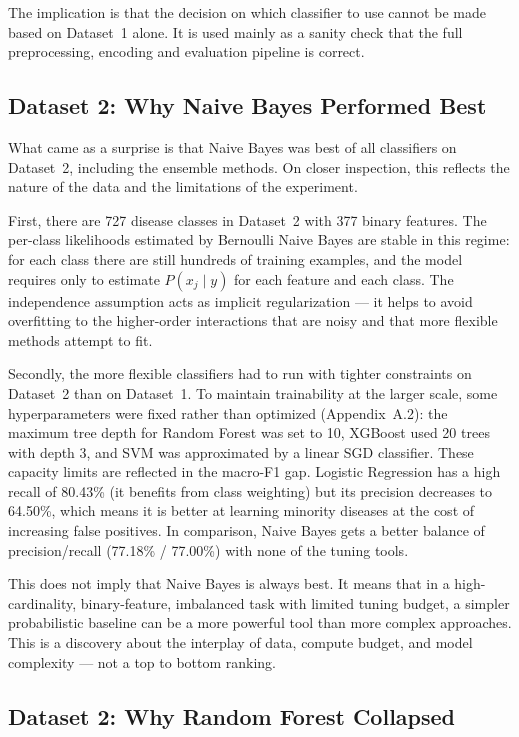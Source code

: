 The implication is that the decision on which classifier to use cannot be made based on Dataset~1 alone. It is used mainly as a sanity check that the full preprocessing, encoding and evaluation pipeline is correct.

\subsection{Dataset 2: Why Naive Bayes Performed Best}

What came as a surprise is that Naive Bayes was best of all classifiers on Dataset~2, including the ensemble methods. On closer inspection, this reflects the nature of the data and the limitations of the experiment.

First, there are 727 disease classes in Dataset~2 with 377 binary features. The per-class likelihoods estimated by Bernoulli Naive Bayes are stable in this regime: for each class there are still hundreds of training examples, and the model requires only to estimate $P(x_j \mid y)$ for each feature and each class. The independence assumption acts as implicit regularization --- it helps to avoid overfitting to the higher-order interactions that are noisy and that more flexible methods attempt to fit.

Secondly, the more flexible classifiers had to run with tighter constraints on Dataset~2 than on Dataset~1. To maintain trainability at the larger scale, some hyperparameters were fixed rather than optimized (Appendix~A.2): the maximum tree depth for Random Forest was set to 10, XGBoost used 20 trees with depth 3, and SVM was approximated by a linear SGD classifier. These capacity limits are reflected in the macro-F1 gap. Logistic Regression has a high recall of 80.43\% (it benefits from class weighting) but its precision decreases to 64.50\%, which means it is better at learning minority diseases at the cost of increasing false positives. In comparison, Naive Bayes gets a better balance of precision/recall (77.18\% / 77.00\%) with none of the tuning tools.

This does not imply that Naive Bayes is always best. It means that in a high-cardinality, binary-feature, imbalanced task with limited tuning budget, a simpler probabilistic baseline can be a more powerful tool than more complex approaches. This is a discovery about the interplay of data, compute budget, and model complexity --- not a top to bottom ranking.

\subsection{Dataset 2: Why Random Forest Collapsed}

